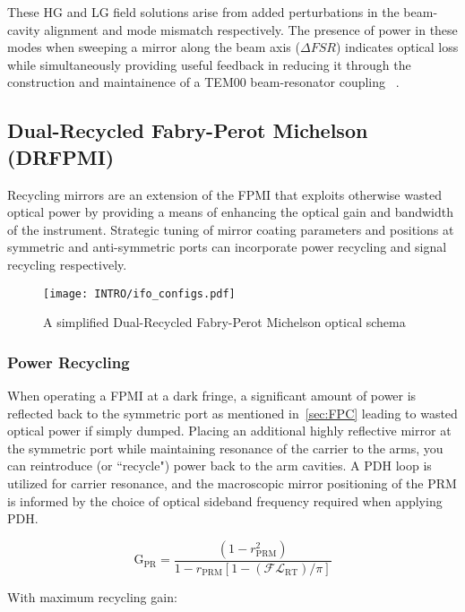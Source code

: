 These HG and LG field solutions arise from added perturbations in the beam-cavity alignment and mode mismatch respectively. The presence of power in these modes when sweeping a mirror along the beam axis ($\Delta FSR$) indicates optical loss while simultaneously providing useful feedback in reducing it through the construction and maintainence of a TEM00 beam-resonator coupling ~\cite{anderson:1984}. 

\subsection{Dual-Recycled Fabry-Perot Michelson (DRFPMI)}
Recycling mirrors are an extension of the FPMI that exploits otherwise wasted optical power by providing a means of enhancing the optical gain and bandwidth of the instrument. Strategic tuning of mirror coating parameters and positions at symmetric and anti-symmetric ports can incorporate power recycling and signal recycling respectively.

\begin{figure}[ht!]
\begin{center}
\texttt{[image: INTRO/ifo\_configs.pdf]}
\end{center}
\caption{A simplified Dual-Recycled Fabry-Perot Michelson optical schema}
\label{fig:drfp_michelson}
\end{figure}

\subsubsection{Power Recycling}
When operating a FPMI at a dark fringe, a significant amount of power is reflected back to the symmetric port as mentioned in~\autoref{sec:FPC} leading to wasted optical power if simply dumped. Placing an additional highly reflective mirror at the symmetric port while maintaining resonance of the carrier to the arms, you can reintroduce (or ``recycle") power back to the arm cavities. A PDH loop is utilized for carrier resonance, and the macroscopic mirror positioning of the PRM is informed by the choice of optical sideband frequency required when applying PDH. 

\begin{equation}
	\mathrm{G_{PR}} = \frac{(1-r_\mathrm{PRM}^2)}{1-r_\mathrm{PRM}[1- (\mathscr{F} \mathscr{L}_\mathrm{RT})/ \pi]}
\end{equation}

\noindent With maximum recycling gain: 

